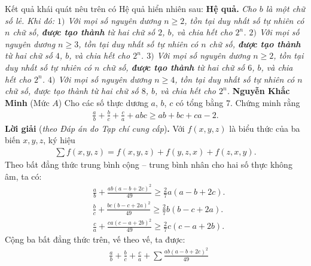 \begin{multicols}{2}
	\vskip 0.05cm
	Kết quả khái quát nêu trên có Hệ quả hiển nhiên sau:
	\vskip 0.05cm
	\textbf{\color{thachthuctoanhoc}Hệ quả.} \textit{Cho $b$ là một chữ số lẻ. Khi đó:
	\vskip 0.05cm
	$1)$ Với mọi số nguyên dương $n \ge 2$, tồn tại duy nhất số tự nhiên có $n$ chữ số, \textbf{\color{thachthuctoanhoc}được tạo thành} từ hai chữ số $2$, $b$, và chia hết cho $2^n$.
	\vskip 0.05cm 
	$2)$ Với mọi số nguyên dương $n \ge 3$, tồn tại duy nhất số tự nhiên có $n$ chữ số, \textbf{\color{thachthuctoanhoc}được tạo thành} từ hai chữ số $4$, $b$, và chia hết cho $2^n$.
	\vskip 0.05cm 
	$3)$ Với mọi số nguyên dương $n \ge 2$, tồn tại duy nhất số tự nhiên có $n$ chữ số, \textbf{\color{thachthuctoanhoc}được tạo thành} từ hai chữ số $6$, $b$, và chia hết cho $2^n$.
	\vskip 0.05cm 
	$4)$ Với mọi số nguyên dương $n \ge 4$, tồn tại duy nhất số tự nhiên có $n$ chữ số, được tạo thành từ hai chữ số $8$, $b$, và chia hết cho $2^n$.}
	\vskip 0.05cm
		\hfill \textbf{\color{thachthuctoanhoc}Nguyễn Khắc Minh}
	\vskip 0.05cm
	{}
	(Mức $A$) Cho các số thực dương $a$, $b$, $c$ có tổng bằng $7$. Chứng minh rằng
	\begin{align*}
		\frac{a}{b} + \frac{b}{c} + \frac{c}{a} + abc \ge ab + bc + ca - 2.
	\end{align*}
	\textbf{\color{thachthuctoanhoc}Lời giải} (\textit{theo Đáp án do Tạp chí cung cấp})\textbf{\color{thachthuctoanhoc}.}
	\vskip 0.05cm
	Với $f\left( {x,y,z} \right)$  là biểu thức của ba biến $x, y, z$, ký hiệu
	\begin{align*}
		\sum {f\!\left( {x,y,z} \right)}  \!=\! f\!\left( {x,y,z} \right) \!+\! f\!\left( {y,z,x} \right) \!+\! f\!\left( {z,x,y} \right)\!.
	\end{align*}
	Theo bất đẳng thức trung bình cộng -- trung bình nhân cho hai số thực không âm, ta có:
	\begin{align*}
		&\frac{a}{b} + \frac{{ab{{\left( {a - b + 2c} \right)}^2}}}{{49}} \ge \frac{2}{7}a\left( {a - b + 2c} \right).\\[-0.1ex]
		&\frac{b}{c} + \frac{{bc{{\left( {b - c + 2a} \right)}^2}}}{{49}} \ge \frac{2}{7}b\left( {b - c + 2a} \right).\\[-0.1ex]
		&\frac{c}{a} + \frac{{ca{{\left( {c - a + 2b} \right)}^2}}}{{49}} \ge \frac{2}{7}c\left( {c - a + 2b} \right).
	\end{align*}
	Cộng ba bất đẳng thức trên, vế theo vế, ta được:
	\begin{align*}
		&\frac{a}{b} + \frac{b}{c} + \frac{c}{a} + \sum {\frac{{ab{{\left( {a - b + 2c} \right)}^2}}}{{49}}}  \\[-0.1ex]

\end{align*}
\end{multicols}
